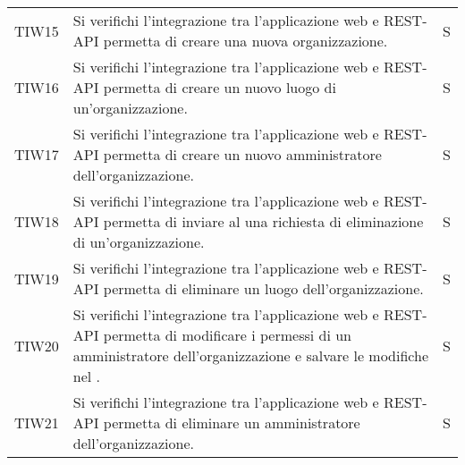 {\begin{longtable}{ c C{13cm} C{1cm}}
TIW15 & Si verifichi l’integrazione tra l’applicazione web e REST-API permetta di creare una nuova organizzazione.& S \\
TIW16 & Si verifichi l’integrazione tra l’applicazione web e REST-API permetta di creare un nuovo luogo di un’organizzazione.& S \\
TIW17 & Si verifichi l’integrazione tra l’applicazione web e REST-API permetta di creare un nuovo amministratore dell’organizzazione.& S \\
TIW18 & Si verifichi l’integrazione tra l’applicazione web e REST-API permetta di inviare al  una richiesta di eliminazione di un’organizzazione.& S \\
TIW19 & Si verifichi l’integrazione tra l’applicazione web e REST-API permetta di eliminare un luogo dell’organizzazione.& S \\
TIW20 & Si verifichi l’integrazione tra l’applicazione web e REST-API permetta di modificare i permessi di un amministratore dell’organizzazione e salvare le modifiche nel .& S \\
TIW21 & Si verifichi l’integrazione tra l’applicazione web e REST-API permetta di eliminare un amministratore dell’organizzazione.& S \\




\end{longtable}
}